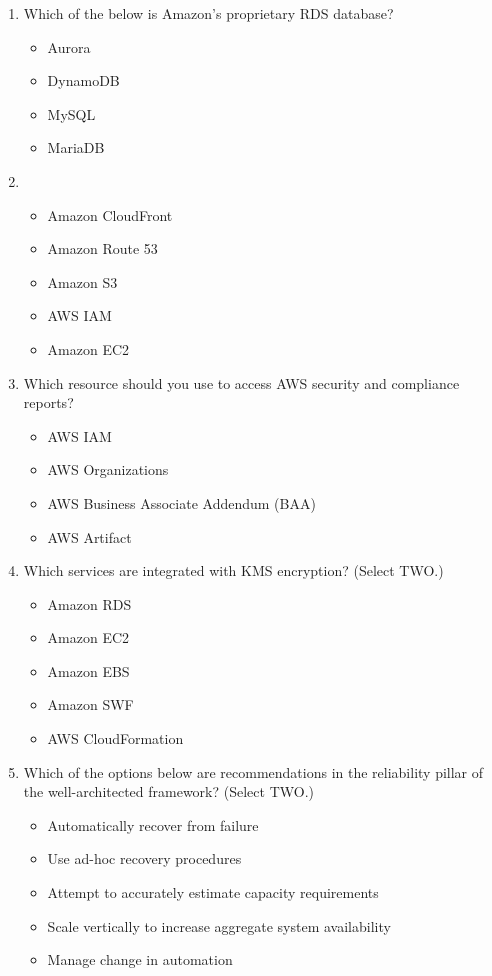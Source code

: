 \begin{enumerate}
	\item Which of the below is Amazon's proprietary RDS database?
	\begin{itemize}
		\item Aurora
		\item DynamoDB
		\item MySQL
		\item MariaDB
	\end{itemize}

	\item 
	\begin{itemize}
		\item Amazon CloudFront
		\item Amazon Route 53
		\item Amazon S3
		\item AWS IAM
		\item Amazon EC2
	\end{itemize}

	\item Which resource should you use to access AWS security and compliance reports?
	\begin{itemize}
		\item AWS IAM
		\item AWS Organizations
		\item AWS Business Associate Addendum (BAA)
		\item AWS Artifact
	\end{itemize}

	\item Which services are integrated with KMS encryption? (Select TWO.)
	\begin{itemize}
		\item Amazon RDS
		\item Amazon EC2
		\item Amazon EBS
		\item Amazon SWF
		\item AWS CloudFormation
	\end{itemize}

	\item Which of the options below are recommendations in the reliability pillar of the well-architected framework? (Select TWO.)
	\begin{itemize}
		\item Automatically recover from failure
		\item Use ad-hoc recovery procedures
		\item Attempt to accurately estimate capacity requirements
		\item Scale vertically to increase aggregate system availability
		\item Manage change in automation
	\end{itemize}


\end{enumerate}
